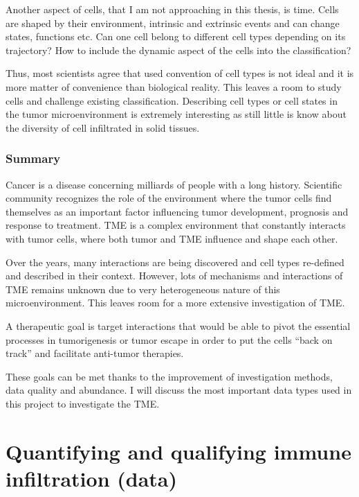 \documentclass[12pt,]{book}
\theoremstyle{definition}
\theoremstyle{definition}
\theoremstyle{definition}
\theoremstyle{remark}
\begin{document}
Another aspect of cells, that I am not approaching in this thesis, is
time. Cells are shaped by their environment, intrinsic and extrinsic
events and can change states, functions etc. Can one cell belong to
different cell types depending on its trajectory? How to include the
dynamic aspect of the cells into the classification?

Thus, most scientists agree that used convention of cell types is not
ideal and it is more matter of convenience than biological reality. This
leaves a room to study cells and challenge existing classification.
Describing cell types or cell states in the tumor microenvironment is
extremely interesting as still little is know about the diversity of
cell infiltrated in solid tissues.

\hypertarget{summary}{%
\subsubsection{Summary}\label{summary}}

Cancer is a disease concerning milliards of people with a long history.
Scientific community recognizes the role of the environment where the
tumor cells find themselves as an important factor influencing tumor
development, prognosis and response to treatment. TME is a complex
environment that constantly interacts with tumor cells, where both tumor
and TME influence and shape each other.

Over the years, many interactions are being discovered and cell types
re-defined and described in their context. However, lots of mechanisms
and interactions of TME remains unknown due to very heterogeneous nature
of this microenvironment. This leaves room for a more extensive
investigation of TME.

A therapeutic goal is target interactions that would be able to pivot
the essential processes in tumorigenesis or tumor escape in order to put
the cells ``back on track'' and facilitate anti-tumor therapies.

These goals can be met thanks to the improvement of investigation
methods, data quality and abundance. I will discuss the most important
data types used in this project to investigate the TME.

\hypertarget{quantifying-and-qualifying-immune-infiltration-data}{%
\section{Quantifying and qualifying immune infiltration
(data)}\label{quantifying-and-qualifying-immune-infiltration-data}}
\end{document}
